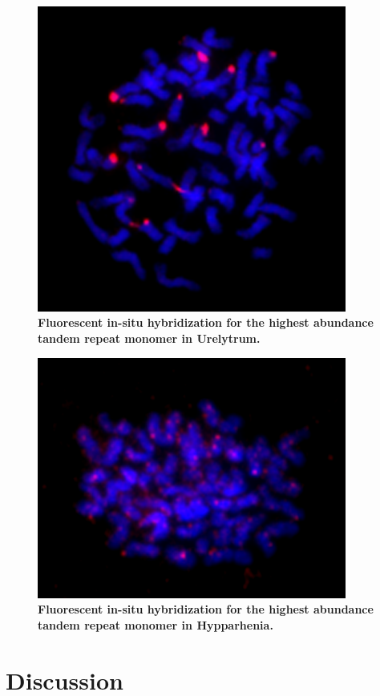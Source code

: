 \documentclass[10pt,letterpaper]{article}
\begin{document}
\begin{figure}[h]
\begin{center}
\includegraphics[width=4in]{Udig_TK271-Repeat.png}
\end{center}
\caption{{\bf Fluorescent in-situ hybridization for the highest abundance tandem repeat monomer in Urelytrum.}}
\label{FISH}
\end{figure}

\begin{figure}[h]
\begin{center}
\includegraphics[width=4in]{Hypdip_TK177-Repet.png}
\end{center}
\caption{{\bf Fluorescent in-situ hybridization for the highest abundance tandem repeat monomer in Hypparhenia.} }
\label{FISH2}
\end{figure}

\section*{Discussion}
\end{document}
